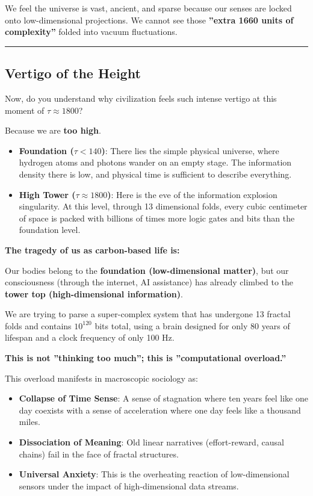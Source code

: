 We feel the universe is vast, ancient, and sparse because our senses are locked onto low-dimensional projections. We cannot see those \textbf{''extra 1660 units of complexity''} folded into vacuum fluctuations.

\hrule

\subsection{Vertigo of the Height}

Now, do you understand why civilization feels such intense vertigo at this moment of $\tau \approx 1800$?

Because we are \textbf{too high}.

\begin{itemize}
\item \textbf{Foundation ($\tau < 140$)}: There lies the simple physical universe, where hydrogen atoms and photons wander on an empty stage. The information density there is low, and physical time is sufficient to describe everything.

\item \textbf{High Tower ($\tau \approx 1800$)}: Here is the eve of the information explosion singularity. At this level, through 13 dimensional folds, every cubic centimeter of space is packed with billions of times more logic gates and bits than the foundation level.
\end{itemize}

\textbf{The tragedy of us as carbon-based life is:}

Our bodies belong to the \textbf{foundation (low-dimensional matter)}, but our consciousness (through the internet, AI assistance) has already climbed to the \textbf{tower top (high-dimensional information)}.

We are trying to parse a super-complex system that has undergone 13 fractal folds and contains $10^{120}$ bits total, using a brain designed for only 80 years of lifespan and a clock frequency of only 100 Hz.

\textbf{This is not ''thinking too much''; this is ''computational overload.''}

This overload manifests in macroscopic sociology as:

\begin{itemize}
\item \textbf{Collapse of Time Sense}: A sense of stagnation where ten years feel like one day coexists with a sense of acceleration where one day feels like a thousand miles.

\item \textbf{Dissociation of Meaning}: Old linear narratives (effort-reward, causal chains) fail in the face of fractal structures.

\item \textbf{Universal Anxiety}: This is the overheating reaction of low-dimensional sensors under the impact of high-dimensional data streams.
\end{itemize}

